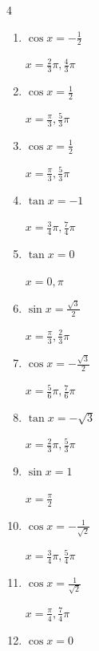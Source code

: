 \begin{multicols}{4}
\begin{enumerate}
        $\displaystyle x = \frac{\pi}{3} , \frac{4}{3}\pi$

  \item $\displaystyle \cos{x}  = -\frac{1}{2}$

        $\displaystyle x = \frac{2}{3}\pi , \frac{4}{3}\pi$

  \item $\displaystyle \cos{x}  = \frac{1}{2}$

        $\displaystyle x = \frac{\pi}{3} , \frac{5}{3}\pi$

  \item $\displaystyle \cos{x}  = \frac{1}{2}$

        $\displaystyle x = \frac{\pi}{3} , \frac{5}{3}\pi$

  \item $\displaystyle \tan{x}  = -1$

        $\displaystyle x = \frac{3}{4}\pi , \frac{7}{4}\pi$

  \item $\displaystyle \tan{x}  = 0$

        $\displaystyle x = 0 , \pi$

  \item $\displaystyle \sin{x}  = \frac{\sqrt{3}}{2}$

        $\displaystyle x = \frac{\pi}{3} , \frac{2}{3}\pi$

  \item $\displaystyle \cos{x}  = -\frac{\sqrt{3}}{2}$

        $\displaystyle x = \frac{5}{6}\pi , \frac{7}{6}\pi$

  \item $\displaystyle \tan{x}  = -\sqrt{3}$

        $\displaystyle x = \frac{2}{3}\pi , \frac{5}{3}\pi$

  \item $\displaystyle \sin{x}  = 1$

        $\displaystyle x = \frac{\pi}{2}$

  \item $\displaystyle \cos{x}  = -\frac{1}{\sqrt{2}}$

        $\displaystyle x = \frac{3}{4}\pi , \frac{5}{4}\pi$

  \item $\displaystyle \cos{x}  = \frac{1}{\sqrt{2}}$

        $\displaystyle x = \frac{\pi}{4} , \frac{7}{4}\pi$

  \item $\displaystyle \cos{x}  = 0$


\end{enumerate}
\end{multicols}
